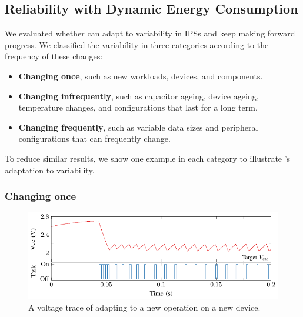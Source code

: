 
\subsection{Reliability with Dynamic Energy Consumption}

We evaluated whether \nn{} can adapt to variability in IPSs and keep making forward progress.
We classified the variability in three categories according to the frequency of these changes: 
\begin{itemize}
    \item \textbf{Changing once}, such as new workloads, devices, and components.
    \item \textbf{Changing infrequently}, such as capacitor ageing, device ageing, temperature changes, and configurations that last for a long term.
    \item \textbf{Changing frequently}, such as variable data sizes and peripheral configurations that can frequently change. 
\end{itemize}
To reduce similar results, we show one example in each category to illustrate \nn{}'s adaptation to variability. 

\subsubsection{Changing once}

\begin{figure}
    \centering
    \includegraphics[width=\columnwidth]{ch5_optic/figures/v_trace/v_trace.pdf}
    \caption{A voltage trace of \nn{} adapting to a new operation on a new device. }
    \label{fig:v_trace}
\end{figure}

